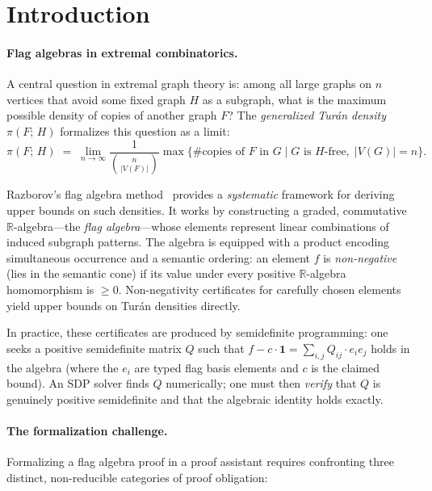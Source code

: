 \documentclass{article}
\newcommand{\tdensity}[2]{\pi(#1;\,#2)}
\begin{document}
\section{Introduction}
\label{sec:intro}

\paragraph{Flag algebras in extremal combinatorics.}
A central question in extremal graph theory is: among all large graphs on $n$
vertices that avoid some fixed graph $H$ as a subgraph, what is the
maximum possible density of copies of another graph $F$?
The \emph{generalized Turán density} $\tdensity{F}{H}$
formalizes this question as a limit:
\[
  \tdensity{F}{H}
    \;=\;
  \lim_{n\to\infty}
  \frac{1}{\binom{n}{|V(F)|}}
  \max\bigl\{\#\text{copies of }F \text{ in } G
             \;\big|\;
             G \text{ is } H\text{-free},\;|V(G)|=n\bigr\}.
\]

Razborov's flag algebra method~\cite{razborov2007flag} provides a
\emph{systematic} framework for deriving upper bounds on such densities.
It works by constructing a graded, commutative $\mathbb{R}$-algebra---the
\emph{flag algebra}---whose elements represent linear combinations of
induced subgraph patterns.  The algebra is equipped with a product encoding
simultaneous occurrence and a semantic ordering: an element $f$ is
\emph{non-negative} (lies in the semantic cone) if its value under every
positive $\mathbb{R}$-algebra homomorphism is $\geq 0$.
Non-negativity certificates for carefully chosen elements yield upper bounds
on Turán densities directly.

In practice, these certificates are produced by semidefinite programming:
one seeks a positive semidefinite matrix $Q$ such that
$f - c\cdot\mathbf{1} = \sum_{i,j} Q_{ij}\cdot e_i e_j$ holds in the algebra
(where the $e_i$ are typed flag basis elements and $c$ is the claimed bound).
An SDP solver finds $Q$ numerically; one must then \emph{verify} that $Q$ is
genuinely positive semidefinite and that the algebraic identity holds exactly.

\paragraph{The formalization challenge.}
Formalizing a flag algebra proof in a proof assistant requires confronting three
distinct, non-reducible categories of proof obligation:
\end{document}
